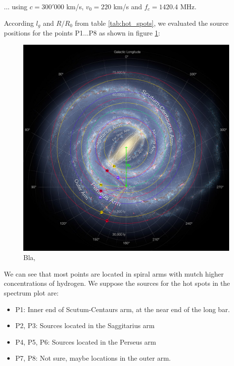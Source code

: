 ... using $c=300'000$ km/s, $v_0 = 220$ km/s and $f_c=1420.4$ MHz.

\pagebreak

According $l_g$ and $R/R_0$ from table \ref{tab:hot_spots}, we evaluated the source positions for the points P1...P8 as shown in figure \ref{fig:mw_roi_spots}:

\begin{figure}[H]
    \centering
    \includegraphics[width=\textwidth]{assets/MW_ROI_spots.png}
    \caption{Bla, \cite{staff_astrophysicists_2016}}
    \label{fig:mw_roi_spots}
\end{figure}

We can see that most points are located in spiral arms with mutch higher concentrations of hydrogen. We suppose the sources for the hot spots in the spectrum plot are:
\begin{itemize}
	\item P1: Inner end of Scutum-Centaurs arm, at the near end of the long bar.
	\item P2, P3: Sources located in the Saggitarius arm
	\item P4, P5, P6: Sources located in the Perseus arm
	\item P7, P8: Not sure, maybe locations in the outer arm.
\end{itemize}

